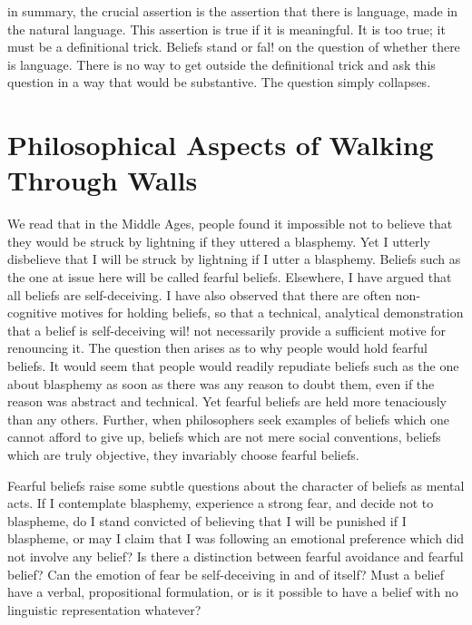 \documentclass[10pt,twoside]{memoir}
\begin{document}
in summary, the crucial assertion is the assertion that there is language, 
made in the natural language. This assertion is true if it is meaningful. It is 
too true; it must be a definitional trick. Beliefs stand or fal! on the question 
of whether there is language. There is no way to get outside the definitional 
trick and ask this question in a way that would be substantive. The question 
simply collapses. 

\chapter{Philosophical Aspects of Walking Through Walls}


We read that in the Middle Ages, people found it impossible not to 
believe that they would be struck by lightning if they uttered a blasphemy. 
Yet I utterly disbelieve that I will be struck by lightning if I utter a 
blasphemy. Beliefs such as the one at issue here will be called fearful beliefs. 
Elsewhere, I have argued that all beliefs are self-deceiving. I have also 
observed that there are often non-cognitive motives for holding beliefs, so 
that a technical, analytical demonstration that a belief is self-deceiving wil! 
not necessarily provide a sufficient motive for renouncing it. The question 
then arises as to why people would hold fearful beliefs. It would seem that 
people would readily repudiate beliefs such as the one about blasphemy as 
soon as there was any reason to doubt them, even if the reason was abstract 
and technical. Yet fearful beliefs are held more tenaciously than any others. 
Further, when philosophers seek examples of beliefs which one cannot 
afford to give up, beliefs which are not mere social conventions, beliefs 
which are truly objective, they invariably choose fearful beliefs. 

Fearful beliefs raise some subtle questions about the character of beliefs 
as mental acts. If I contemplate blasphemy, experience a strong fear, and 
decide not to blaspheme, do I stand convicted of believing that I will be 
punished if I blaspheme, or may I claim that I was following an emotional 
preference which did not involve any belief? Is there a distinction between 
fearful avoidance and fearful belief? Can the emotion of fear be 
self-deceiving in and of itself? Must a belief have a verbal, propositional 
formulation, or is it possible to have a belief with no linguistic representation 
whatever? 
\end{document}

